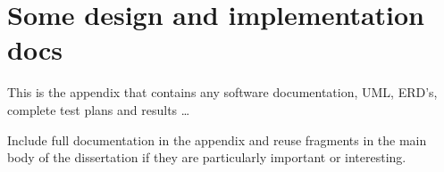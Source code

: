 \chapter{Some design and implementation docs}\label{docs}

This is the appendix that contains any software documentation, UML,
ERD's, complete test plans and results \ldots

Include full documentation in the appendix and reuse fragments in the main
body of the dissertation if they are particularly important or
interesting.
